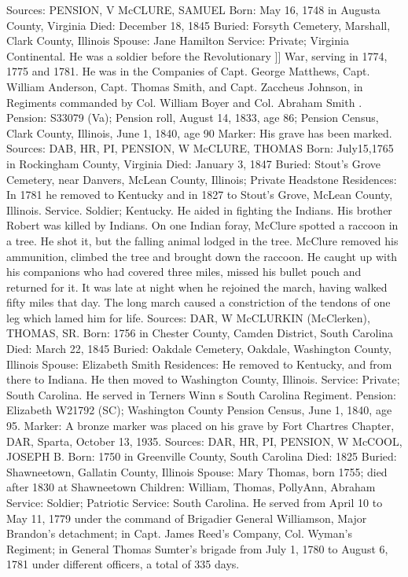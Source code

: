 Sources: PENSION, V 
McCLURE, SAMUEL
Born: May 16, 1748 in Augusta County, Virginia
Died: December 18, 1845
Buried: Forsyth Cemetery, Marshall, Clark County, Illinois
Spouse: Jane Hamilton
Service: Private; Virginia Continental. He was a soldier before the Revolutionary ]]
War, serving in 1774, 1775 and 1781. He was in the Companies of Capt. George Matthews, Capt. William Anderson, Capt. Thomas Smith, and Capt. Zaccheus Johnson, in Regiments commanded by Col. William Boyer and Col. Abraham Smith . 
Pension: S33079 (Va); Pension roll, August 14, 1833, age 86; Pension Census, Clark County, Illinois, June 1, 1840, age 90
Marker: His grave has been marked.
Sources: DAB, HR, PI, PENSION, W 
McCLURE, THOMAS
Born: July15,1765 in Rockingham County, Virginia
Died: January 3, 1847
Buried: Stout's Grove Cemetery, near Danvers, McLean County, Illinois; Private Headstone
Residences: In 1781 he removed to Kentucky and in 1827 to Stout's Grove, McLean County, Illinois. Service. Soldier; Kentucky. He aided in fighting the Indians. His brother Robert was killed by Indians. On one Indian foray, McClure spotted a raccoon in a tree. He shot it, but the falling animal lodged in the tree. McClure removed his ammunition, climbed the tree and brought down the raccoon. He caught up with his companions who had covered three miles, missed his bullet pouch and returned for it. It was late at night when he rejoined the march, having walked fifty miles that day. The long march caused a constriction of the tendons of one leg which lamed him for life. 
Sources: DAR, W 
McCLURKIN (McClerken), THOMAS, SR.
Born: 1756 in Chester County, Camden District, South Carolina 
Died: March 22, 1845 
Buried: Oakdale Cemetery, Oakdale, Washington County, Illinois 
Spouse: Elizabeth Smith 
Residences: He removed to Kentucky, and from there to Indiana. He then moved to Washington County, Illinois. 
Service: Private; South Carolina. He served in Terners Winn s South Carolina Regiment. 
Pension: Elizabeth W21792 (SC); Washington County Pension Census, June 1, 1840, age 95.
Marker: A bronze marker was placed on his grave by Fort Chartres Chapter, DAR, Sparta, October 13, 1935.
Sources: DAR, HR, PI, PENSION, W 
McCOOL, JOSEPH B.
Born: 1750 in Greenville County, South Carolina
Died: 1825 
Buried: Shawneetown, Gallatin County, Illinois 
Spouse: Mary Thomas, born 1755; died after 1830 at Shawneetown 
Children: William, Thomas, PollyAnn, Abraham 
Service: Soldier; Patriotic
Service: South Carolina. He served from April 10 to May 11, 1779 under the command of Brigadier General Williamson, Major Brandon's detachment; in Capt. James Reed's Company, Col. Wyman's Regiment; in General Thomas Sumter's brigade from July 1, 1780 to August 6, 1781 under different officers, a total of 335 days. 
